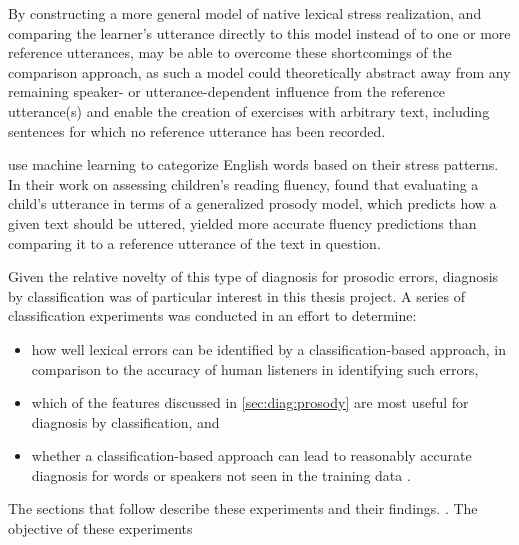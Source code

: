 	By constructing a more general model of native lexical stress realization, and comparing the learner's utterance directly to this model instead of to one or more reference utterances, 
	 may be able to overcome these shortcomings of the comparison approach, 
	as such a model could theoretically
	abstract away from any remaining speaker- or utterance-dependent influence from the reference utterance(s)
	and
	enable the creation of exercises with arbitrary text, including sentences for which no reference utterance has been recorded. 
	
	\textcite{Shahin2012a,Kim2011} use machine learning to categorize English words based on their stress patterns.
	 In their work on assessing children's reading fluency, \textcite{Duong2011} found that evaluating a child's utterance in terms of a generalized prosody model, which predicts how a given text should be uttered, yielded more accurate fluency predictions than comparing it to a reference utterance of the text in question. 
	 
	 
	 Given the relative novelty of this type of diagnosis for prosodic errors, diagnosis by classification was of particular interest in this thesis project. A series of classification experiments was conducted in an effort to determine:
	 \begin{itemize}
	 \item how well lexical errors can be identified by a classification-based approach, in comparison to the accuracy of human listeners in identifying such errors, 
	 \item which of the features discussed in \cref{sec:diag:prosody} are most useful for diagnosis by classification, and
	 \item whether a classification-based approach can lead to reasonably accurate diagnosis for words or speakers not seen in the training data .
	 \end{itemize}
	 The sections that follow describe these experiments and their findings. . 
	 The objective of these experiments 
	 
